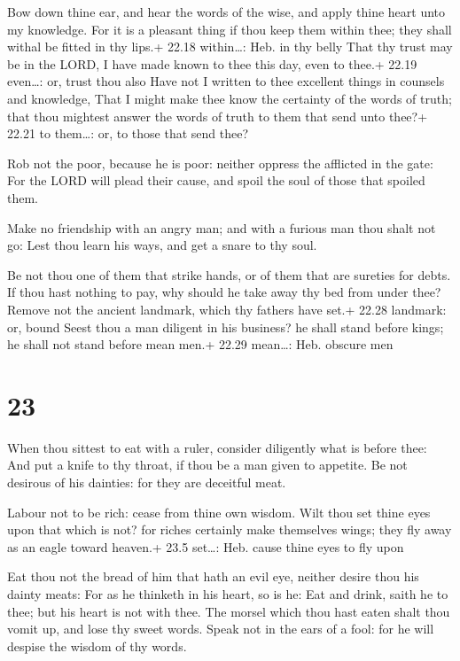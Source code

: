  Bow down thine ear, and hear the words of the wise, and
apply thine heart unto my knowledge.  For it is a pleasant
thing if thou keep them within thee; they shall withal be fitted in thy
lips.+ 22.18 within\ldots: Heb. in thy belly  That thy
trust may be in the LORD, I have made known to thee this day, even to
thee.+ 22.19 even\ldots: or, trust thou also  Have not I
written to thee excellent things in counsels and knowledge,
 That I might make thee know the certainty of the words of
truth; that thou mightest answer the words of truth to them that send
unto thee?+ 22.21 to them\ldots: or, to those that send thee?

 Rob not the poor, because he is poor: neither oppress the
afflicted in the gate:  For the LORD will plead their
cause, and spoil the soul of those that spoiled them.

 Make no friendship with an angry man; and with a furious
man thou shalt not go:  Lest thou learn his ways, and get a
snare to thy soul.

 Be not thou one of them that strike hands, or of them that
are sureties for debts.  If thou hast nothing to pay, why
should he take away thy bed from under thee?  Remove not
the ancient landmark, which thy fathers have set.+ 22.28 landmark: or,
bound  Seest thou a man diligent in his business? he shall
stand before kings; he shall not stand before mean men.+ 22.29
mean\ldots: Heb. obscure men

\hypertarget{section-22}{%
\section{23}\label{section-22}}

 When thou sittest to eat with a ruler, consider diligently
what is before thee:  And put a knife to thy throat, if thou
be a man given to appetite.  Be not desirous of his
dainties: for they are deceitful meat.

 Labour not to be rich: cease from thine own wisdom.
 Wilt thou set thine eyes upon that which is not? for riches
certainly make themselves wings; they fly away as an eagle toward
heaven.+ 23.5 set\ldots: Heb. cause thine eyes to fly upon

 Eat thou not the bread of him that hath an evil eye,
neither desire thou his dainty meats:  For as he thinketh in
his heart, so is he: Eat and drink, saith he to thee; but his heart is
not with thee.  The morsel which thou hast eaten shalt thou
vomit up, and lose thy sweet words.  Speak not in the ears
of a fool: for he will despise the wisdom of thy words.

